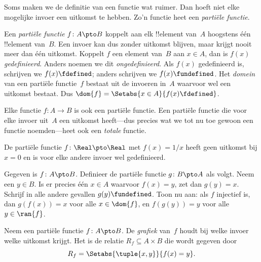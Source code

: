 \documentclass[../../../include/open-logic-section]{subfiles}
\begin{document}


\begin{explain}
Soms maken we de definitie van een functie wat ruimer. Dan hoeft niet
elke mogelijke invoer een uitkomst te hebben. Zo'n functie heet een
\emph{partiële functie}.
\end{explain}

\begin{defn}
Een \emph{partiële functie} $f \colon A \pto B$ koppelt aan elk
!!{element} van~$A$ hoogstens één !!{element} van~$B$. Een invoer kan
dus zonder uitkomst blijven, maar krijgt nooit meer dan één uitkomst. Koppelt $f$ een
element van~$B$ aan $x \in A$, dan is $f(x)$ \emph{gedefinieerd}.
Anders noemen we dit \emph{ongedefinieerd}. Als $f(x)$ gedefinieerd
is, schrijven we $f(x) \fdefined$; anders schrijven we $f(x)
\fundefined$. Het \emph{domein} van een partiële functie~$f$ bestaat
uit de invoeren in~$A$ waarvoor wel een uitkomst bestaat. Dus
$\dom{f} = \Setabs{x \in A}{f(x) \fdefined}$.
\end{defn}

\begin{ex}
Elke functie $f\colon A \to B$ is ook een partiële functie. Een
partiële functie die voor elke invoer uit~$A$ een uitkomst heeft---dus
precies wat we tot nu toe gewoon een functie noemden---heet ook een
\emph{totale} functie.
\end{ex}

\begin{ex}
De partiële functie $f \colon \Real \pto \Real$ met $f(x) = 1/x$ heeft
geen uitkomst bij $x = 0$ en is voor elke andere invoer wel
gedefinieerd.
\end{ex}

\begin{prob}
Gegeven is $f\colon A \pto B$. Definieer de partiële functie $g\colon
B \pto A$ als volgt. Neem een $y \in B$. Is er precies één $x \in A$
waarvoor $f(x) = y$, zet dan $g(y) = x$. Schrijf in alle andere
gevallen $g(y) \fundefined$. Toon nu aan: als $f$ injectief is, dan
$g(f(x)) = x$ voor alle $x \in \dom{f}$, en $f(g(y)) = y$ voor alle
$y \in \ran{f}$.
\end{prob}

\begin{defn}
Neem een partiële functie $f\colon A \pto B$. De \emph{grafiek} van~$f$
houdt bij welke invoer welke uitkomst krijgt. Het is de relatie
$R_f \subseteq A \times B$ die wordt gegeven door
\[
R_f = \Setabs{\tuple{x,y}}{f(x) = y}.
\]
\end{defn}
\end{document}
